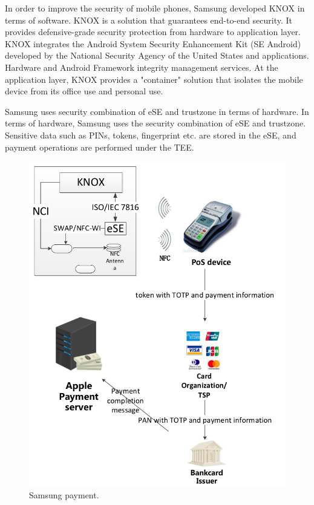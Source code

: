 \documentclass[journal]{IEEEtran}
\begin{document}
In order to improve the security of mobile phones, Samsung developed KNOX in terms of software. KNOX is a solution that guarantees end-to-end security. It provides defensive-grade security protection from hardware to application layer. KNOX integrates the Android System Security Enhancement Kit (SE Android) developed by the National Security Agency of the United States and applications. Hardware and Android Framework integrity management services. At the application layer, KNOX provides a "container" solution that isolates the mobile device from its office use and personal use.

Samsung uses security combination of eSE and trustzone in terms of hardware. In terms of hardware, Samsung uses the security combination of eSE and trustzone. Sensitive data such as PINs, tokens, fingerprint etc. are stored in the eSE, and payment operations are performed under the TEE.

\begin{figure}[htbp]
\centerline{\includegraphics[scale=0.4]{samxing_pay.png}}
\caption{Samsung payment.}
\label{fig}
\end{figure}
\end{document}
